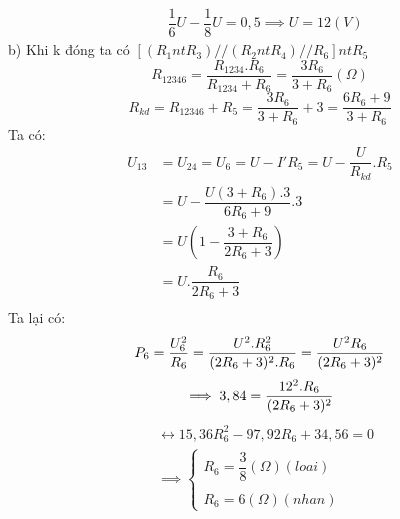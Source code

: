 \documentclass[50pt]{article}
\begin{document}
\begin{equation*}
    \begin{aligned}
        & \dfrac{1}{6}U - \dfrac{1}{8}U = 0,5
        \implies U = 12 (V)
    \end{aligned}
\end{equation*}
b) Khi k đóng ta có $[(R_{1} nt R_{3}) // (R_{2} nt R_{4}) // R_{6}] nt R_{5}$\\
\begin{equation*}
    R_{12346} = \dfrac{R_{1234}.R_{6}}{R_{1234} + R_{6}} = \dfrac{3R_{6}}{3 + R_{6}} (\Omega)
\end{equation*}
\begin{equation*}
    R_{kd} = R_{12346} + R_{5} = \dfrac{3R_{6}}{3 + R_{6}} + 3 = \dfrac{6R_{6} + 9}{3 + R_{6}}
\end{equation*}
Ta có:
\begin{equation*}
    \begin{aligned}
        U_{13} & = U_{24} = U_{6} = U - I'R_{5} = U - \dfrac{U}{R_{kd}}.R_{5} \\
               & = U - \dfrac{U(3 + R_{6}).3}{6R_{6} + 9}.3 \\
               & = U(1 - \dfrac{3 + R_{6}}{2R_{6} + 3}) \\
               & = U.\dfrac{R_{6}}{2R_{6} + 3} \\
    \end{aligned}
\end{equation*}
Ta lại có:
\begin{equation*}
P_{6} = \dfrac{U_{6}^2}{R_{6}} = \dfrac{U^2.R_{6}^2}{(2R_{6} + 3)^2.R_{6}} = \dfrac{U^2R_{6}}{(2R_{6} + 3)^2}\\
\end{equation*}
\begin{equation*}
    \implies 3,84 = \dfrac{12^2.R_{6}}{(2R_{6} + 3)^2}\\
\end{equation*}
\begin{equation*}
    \begin{aligned}
        & \leftrightarrow 15,36R_{6}^2 - 97,92R_{6} + 34,56 = 0\\
        & \implies \begin{cases}
            R_{6} = \dfrac{3}{8} (\Omega) (loai)\\
            \\
            R_{6} = 6 (\Omega) (nhan)
        \end{cases}
    \end{aligned}
\end{equation*}
\end{document}
